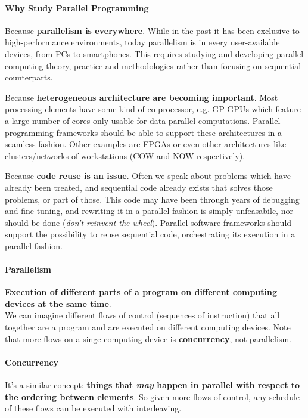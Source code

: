 \documentclass[10pt]{report}
\begin{document}
\paragraph{Why Study Parallel Programming}
\begin{list}{}{}
	\item Because \textbf{parallelism is everywhere}. While in the past it has been exclusive to high-performance environments, today parallelism is in every user-available devices, from PCs to smartphones. This requires studying and developing parallel computing theory, practice and methodologies rather than focusing on sequential counterparts.
	\item Because \textbf{heterogeneous architecture are becoming important}. Most processing elements have some kind of co-processor, e.g. GP-GPUs which feature a large number of cores only usable for data parallel computations. Parallel programming frameworks should be able to support these architectures in a seamless fashion. Other examples are FPGAs or even other architectures like clusters/networks of workstations (COW and NOW respectively).
	\item Because \textbf{code reuse is an issue}. Often we speak about problems which have already been treated, and sequential code already exists that solves those problems, or part of those. This code may have been through years of debugging and fine-tuning, and rewriting it in a parallel fashion is simply unfeasabile, nor should be done (\textit{don't reinvent the wheel}). Parallel software frameworks should support the possibility to reuse sequential code, orchestrating its execution in a parallel fashion.
\end{list}
\paragraph{Parallelism} \textbf{Execution of different parts of a program on different computing devices at the same time}.\\
We can imagine different flows of control (sequences of instruction) that all together are a program and are executed on different computing devices. Note that more flows on a singe computing device is \textbf{concurrency}, not parallelism.
\paragraph{Concurrency} It's a similar concept: \textbf{things that \textit{may} happen in parallel with respect to the ordering between elements}. So given more flows of control, any schedule of these flows can be executed with interleaving.
\end{document}
